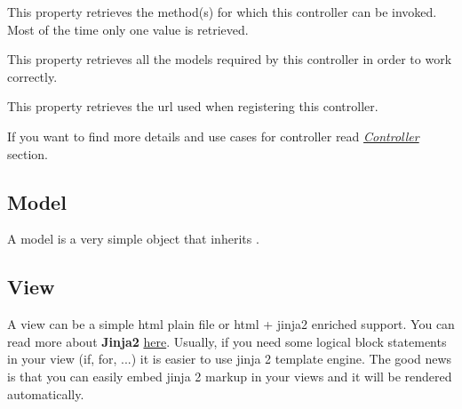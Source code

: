 \documentclass[letterpaper,10pt,english]{sphinxmanual}
\begin{document}
\begin{fulllineitems}
\begin{fulllineitems}
\end{fulllineitems}


\begin{fulllineitems}
\label{features/mvc:fantastico.mvc.controller_decorators.Controller.method}
This property retrieves the method(s) for which this controller can be invoked. Most of the time only one value is
retrieved.

\end{fulllineitems}


\begin{fulllineitems}
\label{features/mvc:fantastico.mvc.controller_decorators.Controller.models}
This property retrieves all the models required by this controller in order to work correctly.

\end{fulllineitems}


\begin{fulllineitems}
\label{features/mvc:fantastico.mvc.controller_decorators.Controller.url}
This property retrieves the url used when registering this controller.

\end{fulllineitems}


\end{fulllineitems}


If you want to find more details and use cases for controller read {\hyperref[features/mvc:core-controller-section]{\emph{Controller}}} section.


\subsection{Model}
\label{features/mvc:model}
A model is a very simple object that inherits .


\subsection{View}
\label{features/mvc:view}
A view can be a simple html plain file or html + jinja2 enriched support. You can read more about \textbf{Jinja2}
\href{http://jinja.pocoo.org/docs/}{here}. Usually, if you need some logical block statements in your view (if, for, ...)
it is easier to use jinja 2 template engine. The good news is that you can easily embed jinja 2 markup in your views
and it will be rendered automatically.
\end{document}
